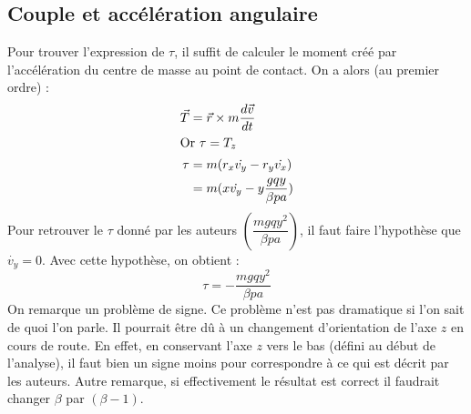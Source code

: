 \documentclass[12pt,a4paper]{article}
\makeatletter
\renewcommand*{\eqref}[1]{%
	\hyperref[{#1}]{\textup{\tagform@{\ref*{#1}}}}%
}
\makeatother
\begin{document}
	\subsection{Couple et accélération angulaire}
	\label{subsec:acceleration-angulaire}
%	
	Pour trouver l'expression de $\tau$, il suffit de calculer le moment créé par l'accélération du centre de masse au point de contact. On a alors (au premier ordre) : 
	\begin{align*}
		\vec{T}	&=\vec{r}\times m\dfrac{d\vec{v}}{dt}\\
		\intertext{Or $\tau=T_z$}
		\tau&=m(r_x\dot{v_y}-r_y\dot{v_x})\\
			&=m(x\dot{v_y}-y\dfrac{gqy}{\beta p a})
	\end{align*}
	Pour retrouver le $\tau$ donné par les auteurs $\left(\dfrac{mgqy^2}{\beta p a}\right)$, il faut faire l'hypothèse que $\dot{v_y}=0$. Avec cette hypothèse, on obtient : 
	$$\tau=-\dfrac{mgqy^2}{\beta p a}$$
	On remarque un problème de signe. Ce problème n'est pas dramatique si l'on sait de quoi l'on parle. Il pourrait être dû à un changement d'orientation de l'axe $z$ en cours de route.
	En effet, en conservant l'axe $z$ vers le bas (défini au début de l'analyse), il faut bien un signe moins pour correspondre à ce qui est décrit par les auteurs.
	Autre remarque, si effectivement le résultat \eqref{eq:erreur} est correct il faudrait changer $\beta$ par $(\beta-1)$.
	
\end{document}

